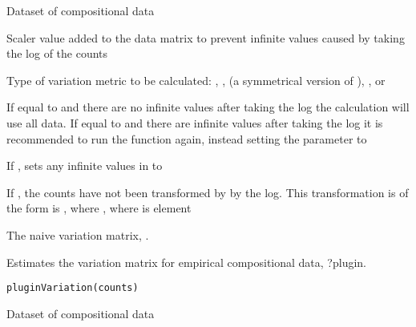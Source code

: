 \documentclass[a4paper]{book}
\begin{document}
%
\begin{Arguments}
\begin{ldescription}
\item[\code{counts}] Dataset of compositional data

\item[\code{pseudo.count}] Scaler value added to the data matrix to prevent infinite 
values caused by taking the log of the counts

\item[\code{type}] Type of variation metric to be calculated: , ,
 (a symmetrical version of ), , or 

\item[\code{use}] If equal to  and there are no infinite values after
taking the log the calculation will use all data. If equal to  
and there are infinite values after taking the log it is recommended to  run 
the function again, instead setting the  parameter to 

\item[\code{set.inf.na}] If , sets any infinite values in  to 

\item[\code{already.log}] If , the counts have not been transformed by 
by the log. This transformation is of the form is , where 
, where  is element 
\end{ldescription}
\end{Arguments}
%
\begin{Value}
The naive variation matrix, .
\end{Value}
%
\begin{Description}\relax
Estimates the variation matrix for empirical compositional data, ?plugin.
\end{Description}
%
\begin{Usage}
\begin{verbatim}
pluginVariation(counts)
\end{verbatim}
\end{Usage}
%
\begin{Arguments}
\begin{ldescription}
\item[\code{counts}] Dataset of compositional data
\end{ldescription}
\end{Arguments}
\end{document}

